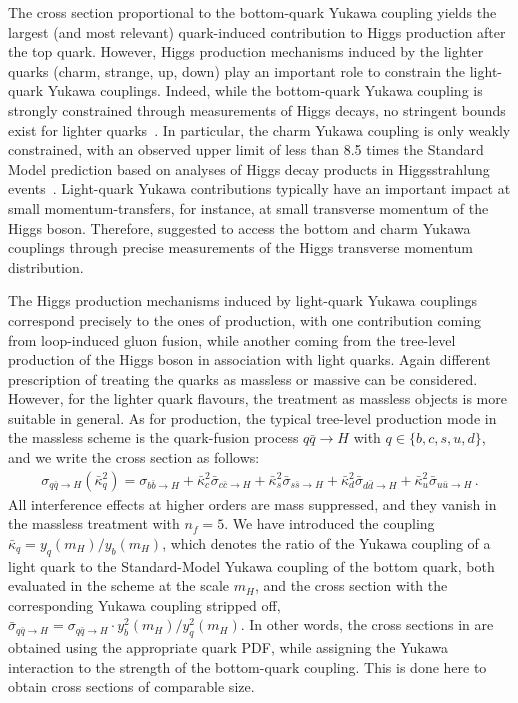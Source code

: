 \documentclass[11pt,a4paper]{article}
\begin{document}
The cross section proportional to the bottom-quark Yukawa coupling yields 
the largest (and most relevant) quark-induced contribution to Higgs production 
after the top quark. However, Higgs production mechanisms induced by the lighter 
quarks (charm, strange, up, down) play an important role to constrain 
the light-quark Yukawa couplings. 
Indeed, while the bottom-quark Yukawa coupling is strongly constrained through measurements of Higgs decays, no stringent bounds exist for lighter quarks~\cite{Kagan:2014ila}. 
 In particular, the charm Yukawa coupling is only weakly constrained, with an observed upper limit of less than 8.5 times the Standard Model prediction based on analyses of Higgs decay products in Higgsstrahlung events~\cite{Atlas:2022ers}. 
Light-quark Yukawa contributions typically have an important
impact at small momentum-transfers, for instance, at small transverse momentum
of the Higgs boson. Therefore,  suggested
to access the bottom and charm Yukawa couplings through precise measurements
of the Higgs transverse momentum distribution.

The Higgs production mechanisms induced by light-quark Yukawa couplings correspond
precisely to the ones of \bbH{} production, with one contribution coming from 
loop-induced gluon fusion, while another coming from the 
tree-level production of the Higgs boson in association with light quarks. Again different
prescription of treating the quarks as massless or massive can be considered. However,
for the lighter quark flavours, the treatment as massless objects is more suitable
in general. As for \bbH{} production, the 
typical tree-level production mode in the massless scheme 
is the quark-fusion process $q\bar q\to H$ with $q\in\{b,c,s,u,d\}$, 
and we write the cross section as follows:
\begin{align}
\label{eq:light-cs}
\sigma_{q\bar q \rightarrow H}(\bar \kappa_q^2)=\sigma_{b\bar b \rightarrow H}+\bar \kappa_c^2 \bar \sigma_{c\bar c \rightarrow H}+\bar \kappa_s^2 \bar \sigma_{s\bar s \rightarrow H}+\bar \kappa_d^2 \bar \sigma_{d\bar d \rightarrow H}+\bar \kappa_u^2 \bar \sigma_{u\bar u \rightarrow H}\,.
\end{align}
All interference effects at higher orders are mass suppressed, and they
vanish in the massless treatment with $ n_f = 5 $. 
We have introduced the coupling $\bar\kappa_q=y_q(m_H)/y_b(m_H)$, which denotes the ratio of the 
Yukawa coupling of a light quark to the Standard-Model Yukawa coupling of the bottom quark, both evaluated in the \MSbar{} scheme at the scale $m_H$, and the 
cross section with the corresponding Yukawa coupling stripped off, 
$\bar\sigma_{q\bar q\to H} =\sigma_{q\bar q\to H}\cdot y_b^2(m_H)/y_q^2(m_H)$.
In other words, the cross sections in  are obtained 
using the appropriate quark PDF, while assigning the Yukawa interaction 
to the strength of the bottom-quark coupling. This is done here to obtain cross sections of
comparable size.
\end{document}
